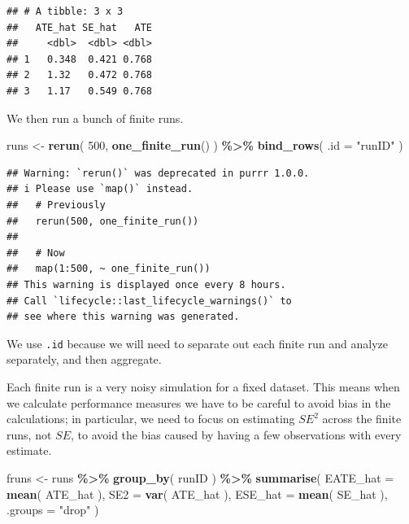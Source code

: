 \documentclass[
]{book}
\newenvironment{Shaded}{\begin{snugshade}}{\end{snugshade}}
\newcommand{\AttributeTok}[1]{\textcolor[rgb]{0.13,0.29,0.53}{#1}}
\newcommand{\DecValTok}[1]{\textcolor[rgb]{0.00,0.00,0.81}{#1}}
\newcommand{\FunctionTok}[1]{\textcolor[rgb]{0.13,0.29,0.53}{\textbf{#1}}}
\newcommand{\NormalTok}[1]{#1}
\newcommand{\OtherTok}[1]{\textcolor[rgb]{0.56,0.35,0.01}{#1}}
\newcommand{\SpecialCharTok}[1]{\textcolor[rgb]{0.81,0.36,0.00}{\textbf{#1}}}
\newcommand{\StringTok}[1]{\textcolor[rgb]{0.31,0.60,0.02}{#1}}
\begin{document}
\begin{verbatim}
## # A tibble: 3 x 3
##   ATE_hat SE_hat   ATE
##     <dbl>  <dbl> <dbl>
## 1   0.348  0.421 0.768
## 2   1.32   0.472 0.768
## 3   1.17   0.549 0.768
\end{verbatim}

We then run a bunch of finite runs.

\begin{Shaded}
\begin{Highlighting}[]
\NormalTok{runs }\OtherTok{\textless{}{-}} \FunctionTok{rerun}\NormalTok{( }\DecValTok{500}\NormalTok{, }\FunctionTok{one\_finite\_run}\NormalTok{() ) }\SpecialCharTok{\%\textgreater{}\%}
  \FunctionTok{bind\_rows}\NormalTok{( }\AttributeTok{.id =} \StringTok{"runID"}\NormalTok{ )}
\end{Highlighting}
\end{Shaded}

\begin{verbatim}
## Warning: `rerun()` was deprecated in purrr 1.0.0.
## i Please use `map()` instead.
##   # Previously
##   rerun(500, one_finite_run())
## 
##   # Now
##   map(1:500, ~ one_finite_run())
## This warning is displayed once every 8 hours.
## Call `lifecycle::last_lifecycle_warnings()` to
## see where this warning was generated.
\end{verbatim}

We use \texttt{.id} because we will need to separate out each finite run and analyze separately, and then aggregate.

Each finite run is a very noisy simulation for a fixed dataset.
This means when we calculate performance measures we have to be careful to avoid bias in the calculations; in particular, we need to focus on estimating \(SE^2\) across the finite runs, not \(SE\), to avoid the bias caused by having a few observations with every estimate.

\begin{Shaded}
\begin{Highlighting}[]
\NormalTok{fruns }\OtherTok{\textless{}{-}}\NormalTok{ runs }\SpecialCharTok{\%\textgreater{}\%} \FunctionTok{group\_by}\NormalTok{( runID ) }\SpecialCharTok{\%\textgreater{}\%}
  \FunctionTok{summarise}\NormalTok{( }\AttributeTok{EATE\_hat =} \FunctionTok{mean}\NormalTok{( ATE\_hat ),}
             \AttributeTok{SE2 =} \FunctionTok{var}\NormalTok{( ATE\_hat ),}
             \AttributeTok{ESE\_hat =} \FunctionTok{mean}\NormalTok{( SE\_hat ),}
             \AttributeTok{.groups =} \StringTok{"drop"}\NormalTok{ )}
\end{Highlighting}
\end{Shaded}
\end{document}
